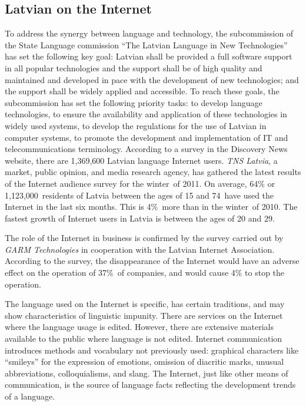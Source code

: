 \begin{multicols}{2}
\subsection{Latvian on the Internet}

To address the synergy between language and technology, the subcommission of the State Language commission “The Latvian Language in New Technologies” has set the following key goal: Latvian shall be provided a full software support in all popular technologies and the support shall be of high quality and maintained and developed in pace with the development of new technologies; and the support shall be widely applied and accessible.
To reach these goals, the subcommission has set the following priority tasks: to develop language technologies, to ensure the availability and application of these technologies in widely used systems, to develop the regulations for the use of Latvian in computer systems, to promote the development and implementation of IT and telecommunications terminology.
According to a survey in the Discovery News website, there are 1,369,600 Latvian language Internet users.
\textit{TNS Latvia}, a market, public opinion, and media research agency, has gathered the latest results of the Internet audience survey for the winter~of 2011.
On average, 64\% or 1,123,000~residents of Latvia between the ages of 15 and 74~have used the Internet in the last six months.
This is 4\%~more than in the winter~of 2010.
The fastest growth of Internet users in Latvia is between the ages of 20 and 29.

The role of the Internet in business is confirmed by the survey carried out by \textit{GARM Technologies} in cooperation with the Latvian Internet Association.
According to the survey, the disappearance of the Internet would have an adverse effect on the operation of 37\%~of companies, and would cause 4\% to stop the operation.

The language used on the Internet is specific, has certain traditions, and may show characteristics of linguistic impunity.
There are services on the Internet where the language usage is edited.
However, there are extensive materials available to the public where language is not edited.
Internet communication introduces methods and vocabulary not previously used: graphical characters like ``smileys'' for the expression of emotions, omission of diacritic marks, unusual abbreviations, colloquialisms, and slang.
The Internet, just like other means of communication, is the source of language facts reflecting the development trends of a language.


\end{multicols}
